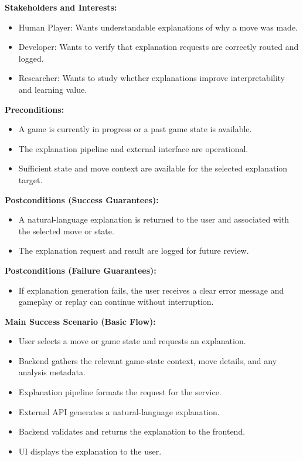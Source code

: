 \documentclass{article}
\begin{document}
\noindent\textbf{Stakeholders and Interests:}
\begin{itemize}
    \item Human Player: Wants understandable explanations of why a move was made.
    \item Developer: Wants to verify that explanation requests are correctly routed and logged.
    \item Researcher: Wants to study whether explanations improve interpretability and learning value.
\end{itemize}

\noindent\textbf{Preconditions:}
\begin{itemize}
    \item A game is currently in progress or a past game state is available.
    \item The explanation pipeline and external \LLM{} interface are operational.
    \item Sufficient state and move context are available for the selected explanation target.
\end{itemize}

\noindent\textbf{Postconditions (Success Guarantees):}
\begin{itemize}
    \item A natural-language explanation is returned to the user and associated with the selected move or state.
    \item The explanation request and result are logged for future review.
\end{itemize}

\noindent\textbf{Postconditions (Failure Guarantees):}
\begin{itemize}
    \item If explanation generation fails, the user receives a clear error message and gameplay or replay can continue without interruption.
\end{itemize}

\noindent\textbf{Main Success Scenario (Basic Flow):}
\begin{itemize}
    \item User selects a move or game state and requests an explanation.
    \item Backend gathers the relevant game-state context, move details, and any analysis metadata.
    \item Explanation pipeline formats the request for the \LLM{} service.
    \item External \LLM{} API generates a natural-language explanation.
    \item Backend validates and returns the explanation to the frontend.
    \item UI displays the explanation to the user.
\end{itemize}
\end{document}
